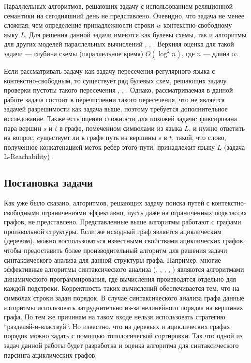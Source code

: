 Параллельных алгоритмов, решающих задачу с использованием реляционной семантики на сегодняшний день не представлено. Очевидно, что задача не менее сложная, чем определение принадлежности строки $w$ контекстно-свободному яыку $L$. Для решения данной задачи имеются как булевы схемы, так и алгоритмы для других моделей параллельных вычислений \cite{Brent}, \cite{Ruzzo}, \cite{Rytter}. Верхняя оценка для такой задачи --- глубина схемы (параллельное время) $O(\log^2 n)$, где $n$ --- длина $w$.

Если рассматривать задачу как задачу пересечения регулярного языка с контекстно-свободным, то существует ряд булевых схем, решающих задачу проверки пустоты такого пересечения \cite{Lohrey}, \cite{Regularrealizability}, \cite{Swernofsky2015OnTC}. Однако, рассматриваемая в данной работе задача состоит в перечислении такого пересечения, что не является задачей разрешимости как задача выше, поэтому требуется дополнительное исследование. Также есть оценки сложности для похожей задачи: фиксирована пара вершин $s$ и $t$ в графе, помеченном символами из языка $L$, и нужно ответить на вопрос, cуществует ли в графе путь из вершины $s$ в $t$, такой, что слово, полученное конкатенацией меток ребер этого пути, принадлежит языку $L$ (задача L-Reachability) \cite{LReach}.
\subsection{Постановка задачи}
Как уже было сказано, алгоритмов, решающих задачу поиска путей с контекстно-свободными ограничениями эффективно, пусть даже на ограниченных подклассах графов, не представлено.
Представленные выше алгоритмы работают с графами произвольной
структуры. Если же исходный граф является ациклическим
(деревом), можно воспользоваться известными свойствами
ациклических графов, чтобы предоставить более
производительный алгоритм для решения задачи синтаксического
анализа для данной структуры графа. Например, многие эффективные алгоритмы синтаксического анализа (\cite{Valiant}, \cite{Kasami}, \cite{OkhotinParse}, \cite{Earley}, \cite{Yonger}) являются алгоритмами динамического программирования, где вычисления производятся отдельно для каждой подстроки. Корректность таких вычислений обеспечивается тем, что на символах строки задан порядок. В случае синтаксического анализа графа данные алгоритмы использовать затруднительно из-за нелинейного порядка на вершинах графа. По тем же причинам на таком входе нельзя использовать стратегию ``разделяй-и-властвуй``. Но известно, что на деревьях и ациклических графах порядок можно задать с помощью топологической сортировки. Так что одной из задач данной работы будет разработка и оценка алгоритма для синтаксического парсинга ациклических графов.

